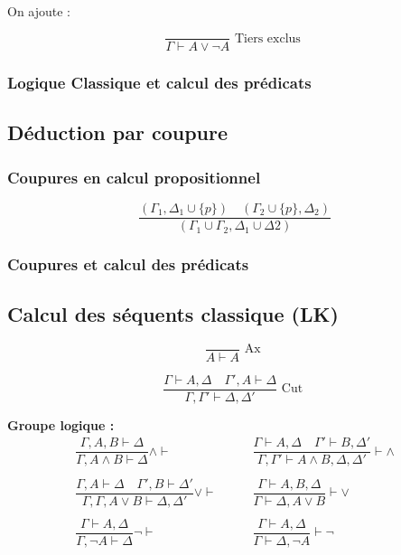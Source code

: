 \documentclass[french]{article}
\begin{document}
On ajoute : 

\[\dfrac{}{\Gamma\vdash A\vee\neg A}\text{ Tiers exclus }\]

\subsubsection{Logique Classique et calcul des prédicats}


\subsection{Déduction par coupure}

\subsubsection{Coupures en calcul propositionnel}

\[\dfrac{(\Gamma_1,\Delta_1\cup\{p\}) \quad (\Gamma_2\cup\{p\}, \Delta_2)}{(\Gamma_1\cup\Gamma_2, \Delta_1\cup\Delta2)}\]


\subsubsection{Coupures et calcul des prédicats}


\subsection{Calcul des séquents classique (LK)}

\[\dfrac{}{A \vdash A} \text{ Ax }\]

\[\dfrac{\Gamma \vdash A,\Delta \quad \Gamma',A \vdash \Delta}{\Gamma,\Gamma' \vdash \Delta, \Delta'} \text{ Cut }\]

\textbf{Groupe logique :}
\begin{align*}
\dfrac{\Gamma,A,B \vdash \Delta}{\Gamma, A \land B \vdash \Delta} \land \vdash &\qquad 
\dfrac{\Gamma \vdash A,\Delta \quad \Gamma' \vdash B,\Delta'}{\Gamma,\Gamma' \vdash A \land B, \Delta, \Delta'} \vdash \land \\ 
\\
\dfrac{\Gamma, A \vdash\Delta \quad \Gamma', B \vdash \Delta'}{\Gamma,\Gamma,  A \lor B \vdash \Delta, \Delta'} \lor \vdash    &\qquad 
\dfrac{\Gamma \vdash A, B, \Delta}{\Gamma \vdash \Delta, A \lor B} \vdash \lor\\
\\
\dfrac{\Gamma \vdash A, \Delta}{\Gamma, \neg A \vdash \Delta} \neg \vdash  &\qquad 
\dfrac{\Gamma \vdash A,\Delta}{\Gamma \vdash \Delta, \neg A} \vdash \neg
\end{align*}
\end{document}
